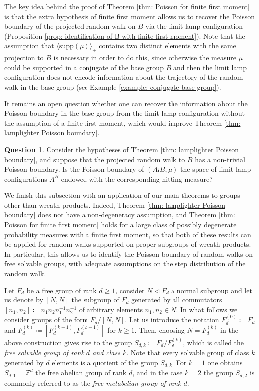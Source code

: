 \documentclass[reqno,oneside,11pt]{amsart}
\newcommand{\Z}{\mathbb{Z}}
\newcommand{\supp}[1]{\mathrm{supp}(#1)}
\theoremstyle{plain}
\theoremstyle{definition}
\newtheorem{question}[thm]{Question}
\begin{document}
The key idea behind the proof of Theorem \ref{thm: Poisson for finite first moment} is that the extra hypothesis of finite first moment allows us to recover the Poisson boundary of the projected random walk on $B$ via the limit lamp configuration (Proposition \ref{prop: identification of B with finite first moment}). Note that the assumption that $\langle \supp{\mu}\rangle_{+}$ contains two distinct elements with the same projection to $B$ is necessary in order to do this, since otherwise the measure $\mu$ could be supported in a conjugate of the base group $B$ and then the limit lamp configuration does not encode information about the trajectory of the random walk in the base group (see Example \ref{example: conjugate base group}). 

It remains an open question whether one can recover the information about the Poisson boundary in the base group from the limit lamp configuration without the assumption of a finite first moment, which would improve Theorem \ref{thm: lamplighter Poisson boundary}.

\begin{question}
	Consider the hypotheses of Theorem \ref{thm: lamplighter Poisson boundary}, and suppose that the projected random walk to $B$ has a non-trivial Poisson boundary. Is the Poisson boundary of $(A\wr B,\mu)$ the space of limit lamp configurations $A^B$ endowed with the corresponding hitting measure?
\end{question}

We finish this subsection with an application of our main theorems to groups other than wreath products. Indeed, Theorem \ref{thm: lamplighter Poisson boundary} does not have a non-degeneracy assumption, and Theorem \ref{thm: Poisson for finite first moment} holds for a large class of possibly degenerate probability measures with a finite first moment, so that both of these results can be applied for random walks supported on proper subgroups of wreath products. In particular, this allows us to identify the Poisson boundary of random walks on free solvable groups, with adequate assumptions on the step distribution of the random walk.

Let $F_d$ be a free group of rank $d\ge 1$, consider $N\lhd F_d$ a normal subgroup and let us denote by $[N,N]$ the subgroup of $F_d$ generated by all commutators $[n_1,n_2]\coloneqq n_1n_2n_1^{-1}n_2^{-1}$ of arbitrary elements $n_1,n_2\in N$. In what follows we consider groups of the form $F_d/[N,N]$. Let us introduce the notation $F_d^{(0)}\coloneqq F_d$ and $F_d^{(k)}\coloneqq\left[F^{(k-1)}_d,F^{(k-1)}_d\right]$ for $k\ge 1$. Then, choosing $N=F_d^{(k)}$ in the above construction gives rise to the group $S_{d,k}\coloneqq F_d/F_d^{(k)}$, which is called the \emph{free solvable group of rank $d$ and class $k$}. Note that every solvable group of class $k$ generated by $d$ elements is a quotient of the group $S_{d,k}$. For $k=1$ one obtains $S_{d,1}=\Z^d$ the free abelian group of rank $d$, and in the case $k=2$ the group $S_{d,2}$ is commonly referred to as the \emph{free metabelian group of rank $d$}.
\end{document}
